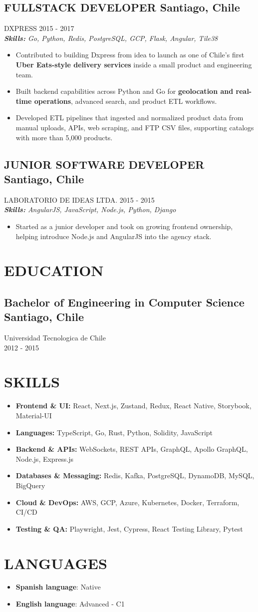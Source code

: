 \documentclass{article}
\newcommand{\SubHeading}[1]{
   \subsection*{#1}\vspace{-0.5em}
}
\newcommand{\WorkExperience}[2]{
   \subsection*{#1}
   \vspace{-1em}
   \uppercase{#2}
}
\newcommand{\Skills}[1]{
   \textit{\textbf{Skills:} #1}
}
\begin{document}
\WorkExperience{FULLSTACK DEVELOPER \hfill Santiago, Chile}{Dxpress \hfill 2015 {-} 2017} \\
\Skills{Go, Python, Redis, PostgreSQL, GCP, Flask, Angular, Tile38}
\begin{itemize}
\item Contributed to building Dxpress from idea to launch as one of Chile's first \textbf{Uber Eats-style delivery services} inside a small product and engineering team.
\item Built backend capabilities across Python and Go for \textbf{geolocation and real-time operations}, advanced search, and product ETL workflows.
\item Developed ETL pipelines that ingested and normalized product data from manual uploads, APIs, web scraping, and FTP CSV files, supporting catalogs with more than 5,000 products.
\end{itemize}

\WorkExperience{JUNIOR SOFTWARE DEVELOPER \hfill Santiago, Chile}{Laboratorio de Ideas Ltda. \hfill 2015 {-} 2015} \\
\Skills{AngularJS, JavaScript, Node.js, Python, Django}
\begin{itemize}
\item Started as a junior developer and took on growing frontend ownership, helping introduce Node.js and AngularJS into the agency stack.
\end{itemize}

\section*{EDUCATION}
\SubHeading{Bachelor of Engineering in Computer Science \hfill Santiago, Chile}
Universidad Tecnologica de Chile \\[0.1em]
2012 {-} 2015

\section*{SKILLS}
\begin{itemize}
	\item \textbf{Frontend \& UI:} React, Next.js, Zustand, Redux, React Native, Storybook, Material-UI
	\item \textbf{Languages:} TypeScript, Go, Rust, Python, Solidity, JavaScript
	\item \textbf{Backend \& APIs:} WebSockets, REST APIs, GraphQL, Apollo GraphQL, Node.js, Express.js
	\item \textbf{Databases \& Messaging:} Redis, Kafka, PostgreSQL, DynamoDB, MySQL, BigQuery
	\item \textbf{Cloud \& DevOps:} AWS, GCP, Azure, Kubernetes, Docker, Terraform, CI/CD
	\item \textbf{Testing \& QA:} Playwright, Jest, Cypress, React Testing Library, Pytest
\end{itemize}

\section*{LANGUAGES}
\begin{itemize}[left=0pt]
	\item \textbf{Spanish language}: Native
	\item \textbf{English language}: Advanced {-} C1
\end{itemize}
\end{document}
